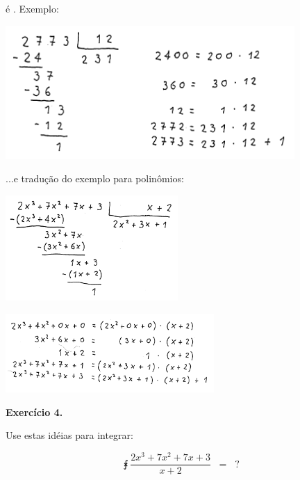 \documentclass[oneside,12pt]{article}
\begin{document}
é . Exemplo:

\includegraphics[width=11cm]{2020-1-C2/20201118_C2_div_com_resto_1.pdf}

\newpage


...e tradução do exemplo para polinômios:

\includegraphics[height=4cm]{2020-1-C2/20201118_C2_div_com_resto_2.pdf}

\includegraphics[height=3cm]{2020-1-C2/20201118_C2_div_com_resto_3.pdf}

\newpage


{\bf Exercício 4.}

\ssk

Use estas idéias para integrar:

$$\intx{\frac{2x^3 + 7x^2 + 7x + 3}{x+2}} \;\; = \;\; ?$$
\end{document}
